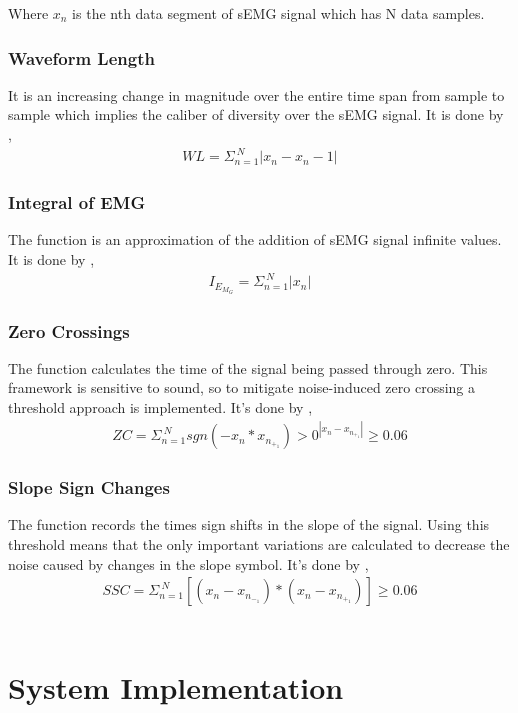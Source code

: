 \documentclass[conference]{IEEEtran}
\begin{document}
Where $x_n$ is the nth data segment of sEMG signal which has N data samples.
\subsubsection{Waveform Length}\label{CC}
It is an increasing change in magnitude over the entire time span from sample to sample which implies the caliber of diversity over the sEMG signal. It is done by \cite{7428468},
\begin{align}
 WL=\Sigma_{n=1}^{\ N} |x_n-x_n-1|
\end{align}
\subsubsection{Integral of EMG}\label{DD}
The function is an approximation of the addition of sEMG signal infinite values. It is done by \cite{7428468},
\begin{align}
 I_E_M_G=\Sigma_{n=1}^{\ N}|x_n|
\end{align}
\subsubsection{Zero Crossings}\label{EE}
The function calculates the time of the signal being passed through zero. This framework is sensitive to sound, so to mitigate noise-induced zero crossing a threshold approach is implemented. It's done by \cite{7428468},
\begin{align}
ZC=\Sigma_{n=1}^{\ N} sgn(-x_n*x_n_+_1)>0 ^|x_n-x_n_+_1|\geq 0.06
\end{align}
\subsubsection{Slope Sign Changes}\label{FF}
The function records the times sign shifts in the slope of the signal. Using this threshold means that the only important variations are calculated to decrease the noise caused by changes in the slope symbol. It's done by \cite{7428468},
\begin{align}
SSC=\Sigma_{n=1}^{\ N} [(x_n-x_n_-_1)*(x_n-x_n_+_1)]\geq 0.06
\end{align}
\
\section{System Implementation}
\end{document}
